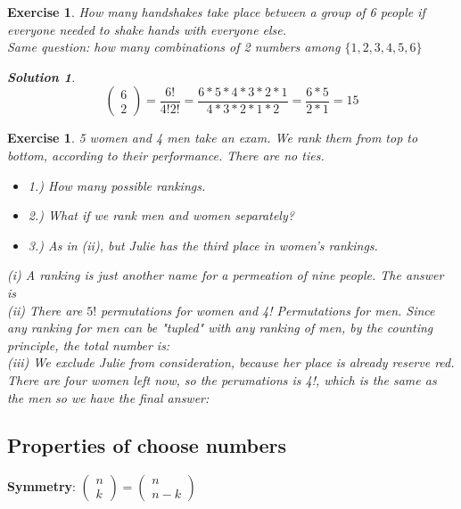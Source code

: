 \documentclass[a4paper]{article}
\newcounter{counter}
\numberwithin{counter}{subsection}
\theoremstyle{break}
\newtheorem*{solution}{Solution}
\newtheorem{exe}[counter]{Exercise}
\begin{document}
		\begin{exe}
			How many handshakes take place between a group of 6 people if everyone needed to shake hands with everyone else.\\
			Same question: how many combinations of 2 numbers among $\{1,2,3,4,5,6\}$
			\begin{solution}
				$$\begin{pmatrix} 6 \\ 2\end{pmatrix} = \frac{6!}{4!2!} = \frac{6 * 5* 4 * 3 * 2 * 1}{4 * 3 * 2 * 1 * 2} = \frac{6 * 5}{2 * 1} = 15$$
			\end{solution}
		\end{exe}

		\begin{exe}
			5 women and 4 men take an exam. We rank them from top to bottom, according to their performance. There are no ties.
			\begin{itemize}
				\item 1.) How many possible rankings.
				\item 2.) What if we rank men and women separately?
				\item 3.) As in (ii), but Julie has the third place in women's rankings. 
			\end{itemize}
			\smallskip

			(i) A ranking is just another name for a permeation of nine people. The answer is \\
			(ii) There are $5!$ permutations for women and 4! Permutations for men. Since any ranking for men can be "tupled" with any ranking of men, by the counting principle, the total number is:
			\\
			(iii) We exclude Julie from consideration, because her place is already reserve red. There are four women left now, so the perumations is 4!, which is the same as the men so we have the final answer: 
		\end{exe}

		\subsection{Properties of choose numbers}%
			
			\textbf{Symmetry}: 
			$\begin{pmatrix} n \\ k\end{pmatrix} = \begin{pmatrix} n \\ n - k\end{pmatrix}$
\end{document}
